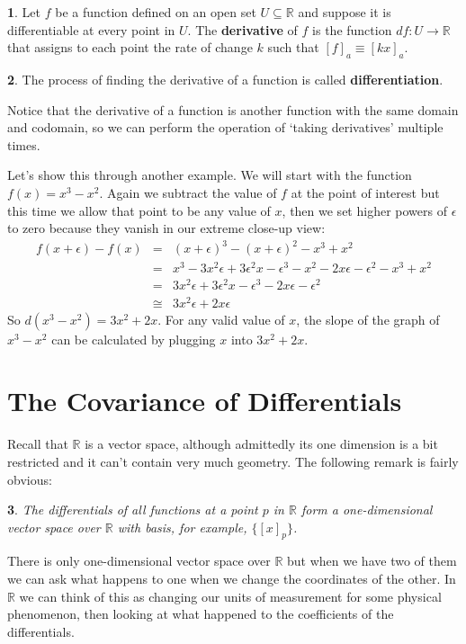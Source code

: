 \documentclass[oneside,english]{amsbook}
\numberwithin{section}{chapter}
\theoremstyle{plain}
\newtheorem{thm}{\protect\theoremname}
\theoremstyle{definition}
\newtheorem{defn}[thm]{\protect\definitionname}
\providecommand{\definitionname}{Definition}
\providecommand{\theoremname}{Theorem}
\begin{document}
			\begin{defn}
				Let $f$ be a function defined on an open set $U\subseteq \mathbb{R}$ and suppose it is differentiable at every point in $U$. The \textbf{derivative} of $f$ is the function $df:U\to\mathbb{R}$ that assigns to each point the rate of change $k$ such that $[f]_a\equiv [kx]_a$.
			\end{defn}
			
			\begin{defn}
				The process of finding the derivative of a function is called \textbf{differentiation}.
			\end{defn}

			Notice that the derivative of a function is another function with the same domain and codomain, so we can perform the operation of `taking derivatives' multiple times. 
			
			Let's show this through another example. We will start with the function $f(x) = x^3 - x^2$. Again we subtract the value of $f$ at the point of interest but this time we allow that point to be any value of $x$, then we set higher powers of $\epsilon$ to zero because they vanish in our extreme close-up view:
			\begin{align}
				f(x + \epsilon) - f(x) &=& (x + \epsilon)^3 - (x + \epsilon)^2 - x^3 + x^2 \\
	                                                  &=& x^3 - 3 x^2 \epsilon + 3 \epsilon^2 x  - \epsilon^3 - x^2 - 2x\epsilon -\epsilon^2 - x^3 + x^2 \\
	                                                   &=& 3 x^2 \epsilon + 3 \epsilon^2 x  - \epsilon^3 - 2x\epsilon -\epsilon^2 \\
	                                                   &\cong& 3 x^2 \epsilon + 2x\epsilon 
			\end{align}
			So $d(x^3-x^2) = 3x^2 + 2x$. For any valid value of $x$, the slope of the graph of $x^3-x^2$ can be calculated by plugging $x$ into $3x^2 + 2x$. 
						
		\section{The Covariance of Differentials}
			
			Recall that $\mathbb{R}$ is a vector space, although admittedly its one dimension is a bit restricted and it can't contain very much geometry. The following remark is fairly obvious:
			\begin{thm}
				The differentials of all functions at a point $p$ in $\mathbb{R}$ form a one-dimensional vector space over $\mathbb{R}$ with basis, for example, $\{[x]_p\}$.
			\end{thm}
			There is only one-dimensional vector space over $\mathbb{R}$ but when we have two of them we can ask what happens to one when we change the coordinates of the other. In $\mathbb{R}$ we can think of this as changing our units of measurement for some physical phenomenon, then looking at what happened to the coefficients of the differentials.
			
\end{document}
